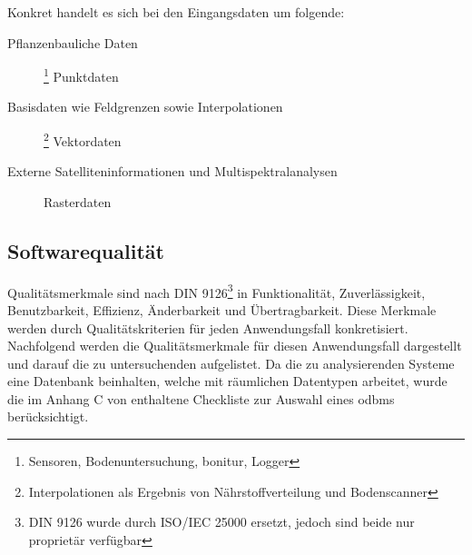 
\newpage
Konkret handelt es sich bei den Eingangsdaten um folgende:
\begin{description}
\item[Pflanzenbauliche Daten]\footnote{Sensoren, Bodenuntersuchung, \Gls{bonitur}, Logger} Punktdaten
\item[Basisdaten wie Feldgrenzen sowie Interpolationen]\footnote{Interpolationen als Ergebnis von Nährstoffverteilung und Bodenscanner} Vektordaten
\item[Externe Satelliteninformationen und Multispektralanalysen] Rasterdaten
\end{description}

\subsection{Softwarequalität}
\label{softwarequalität}
Qualitätsmerkmale sind nach DIN 9126\footnote{DIN 9126 wurde durch ISO/IEC 25000 ersetzt, jedoch sind beide nur proprietär verfügbar} in \cite[S.258 f.]{book:lehrbuchsoftware} Funktionalität, Zuverlässigkeit, Benutzbarkeit, Effizienz, Änderbarkeit und Übertragbarkeit.
Diese Merkmale werden durch Qualitätskriterien für jeden Anwendungsfall konkretisiert.
Nachfolgend werden die Qualitätsmerkmale für diesen Anwendungsfall dargestellt und darauf die zu untersuchenden aufgelistet.
Da die zu analysierenden Systeme eine Datenbank beinhalten, welche mit räumlichen Datentypen arbeitet, wurde die im Anhang C von \cite{book:objdbs} enthaltene Checkliste zur Auswahl eines \Gls{odbms} berücksichtigt.

